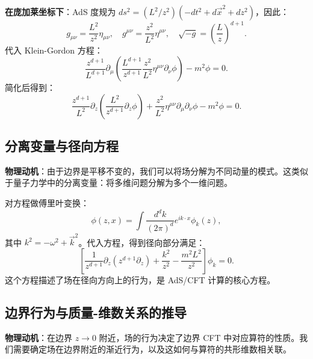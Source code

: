 \textbf{在庞加莱坐标下}：AdS 度规为 $ds^2 = (L^2/z^2)(-dt^2 + d\vec{x}^2 + dz^2)$，因此：
\begin{equation}
    g_{\mu\nu} = \frac{L^2}{z^2} \eta_{\mu\nu}, \quad g^{\mu\nu} = \frac{z^2}{L^2} \eta^{\mu\nu}, \quad \sqrt{-g} = \left(\frac{L}{z}\right)^{d+1}.
\end{equation}
代入 Klein-Gordon 方程：
\begin{equation}
    \frac{z^{d+1}}{L^{d+1}} \partial_\mu \left( \frac{L^{d+1}}{z^{d+1}} \frac{z^2}{L^2} \eta^{\mu\nu} \partial_\nu \phi \right) - m^2 \phi = 0.
\end{equation}
简化后得到：
\begin{equation}
    \frac{z^{d+1}}{L^2} \partial_z \left(\frac{L^2}{z^{d+1}} \partial_z \phi\right) + \frac{z^2}{L^2} \eta^{\mu\nu} \partial_\mu \partial_\nu \phi - m^2 \phi = 0.
\end{equation}

\subsection{分离变量与径向方程}

\textbf{物理动机}：由于边界是平移不变的，我们可以将场分解为不同动量的模式。这类似于量子力学中的分离变量：将多维问题分解为多个一维问题。

对方程做傅里叶变换：
\begin{equation}
    \phi(z, x) = \int \frac{d^d k}{(2\pi)^d} e^{ik \cdot x} \phi_k(z),
\end{equation}
其中 $k^2 = -\omega^2 + \vec{k}^2$。代入方程，得到径向部分满足：
\begin{equation}
    \left[\frac{1}{z^{d+1}} \partial_z \left(z^{d+1} \partial_z\right) + \frac{k^2}{z^2} - \frac{m^2 L^2}{z^2}\right] \phi_k = 0.
    \label{eq:AdS_radial}
\end{equation}
这个方程描述了场在径向方向上的行为，是 AdS/CFT 计算的核心方程。

\subsection{边界行为与质量-维数关系的推导}

\textbf{物理动机}：在边界 $z \to 0$ 附近，场的行为决定了边界 CFT 中对应算符的性质。我们需要确定场在边界附近的渐近行为，以及这如何与算符的共形维数相关联。


